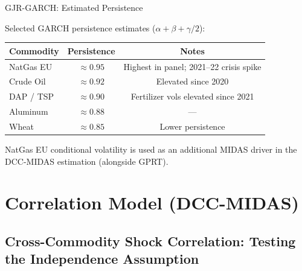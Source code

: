 ﻿\documentclass[aspectratio=1610]{beamer}
\begin{document}
\begin{frame}[shrink=10]{GJR-GARCH: Estimated Persistence}

  Selected GARCH persistence estimates ($\alpha + \beta + \gamma/2$):

  \bigskip

  \begin{tabular}{lcc}
    \toprule
    Commodity    & Persistence & Notes \\
    \midrule
    NatGas EU    & $\approx 0.95$ & Highest in panel; 2021--22 crisis spike \\
    Crude Oil    & $\approx 0.92$ & Elevated since 2020 \\
    DAP / TSP    & $\approx 0.90$ & Fertilizer vols elevated since 2021 \\
    Aluminum     & $\approx 0.88$ & --- \\
    Wheat        & $\approx 0.85$ & Lower persistence \\
    \bottomrule
  \end{tabular}

  \medskip

  NatGas EU conditional volatility is used as an additional MIDAS driver in
  the DCC-MIDAS estimation (alongside GPRT).

\end{frame}

\section{Correlation Model (DCC-MIDAS)}

\subsection{Cross-Commodity Shock Correlation: Testing the Independence Assumption}
\end{document}
